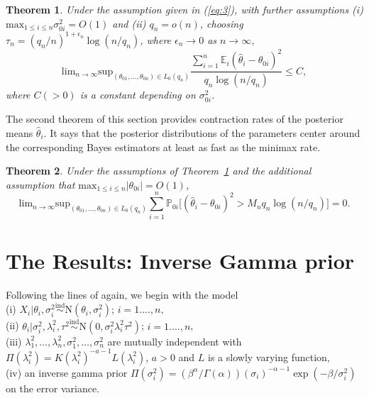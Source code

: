 \documentclass[sn-basic]{sn-jnl}%
\theoremstyle{thmstyleone}%
\newtheorem{theorem}{Theorem}[section]%
\begin{document}
\noindent
\begin{theorem}\label{thm:exp1}
Under the assumption given in (\ref{eq:3}), with further assumptions (i)  
$\mbox{max}_{1\leq i\leq n}\sigma_{0i}^2=O(1)$ and
(ii) $q_n=o(n)$, choosing $\tau_n=(q_n/n)^{1+\epsilon_n}\log(n/q_n)$, where
$\epsilon_n\rightarrow 0$ as $n\rightarrow\infty$,
\begin{equation}
\mbox{lim}_{n\rightarrow\infty}
\mbox{sup}_{(\theta_{01},\ldots,\theta_{0n})\in L_0(q_n)}
\frac{\sum_{i=1}^n \mathbb{E}_{i}(\hat{\theta}_i-\theta_{0i})^2}
{q_n\log(n/q_n)}\leq C,
\label{eq:theorem1}
\end{equation}
where $C(>0)$ is a constant depending on $\sigma_{0i}^2$.
\end{theorem}

\noindent
The second theorem of this section provides contraction rates of the 
posterior means $\hat{\theta}_i$. It says that the posterior distributions
of the parameters center around the corresponding Bayes estimators at least
as fast as the minimax rate.\\

\noindent
\begin{theorem}\label{thm:exp2}
Under the assumptions of Theorem~\ref{thm:exp1} and the additional assumption that
$\mbox{max}_{1\leq i\leq n}|\theta_{0i}|=O(1)$,
\begin{equation}
\mbox{lim}_{n\rightarrow\infty}
\mbox{sup}_{(\theta_{01},\ldots,\theta_{0n})\in L_0(q_n)}
\sum_{i=1}^n \mathbb{P}_{0i}[(\hat{\theta}_i-\theta_{0i})^2>M_n{q_n\log(n/q_n)]}=0.
\label{eq:theorem2}
\end{equation}
\end{theorem}


\section{The Results: Inverse Gamma prior}\label{sec:results-inversegamma}

\noindent
Following the lines of \citet{ghosh2017} again, we begin with the model\\
(i) $X_i|\theta_i,\sigma_i^2\stackrel{\mbox{ind}}
{\sim}\mbox{N}(\theta_i,\sigma_i^2)$;
$i=1.\ldots,n,$\\
(ii) $\theta_i|\sigma_i^2,\lambda_i^2,\tau^2\stackrel{\mbox{ind}}{\sim}
\mbox{N}(0,\sigma_i^2\lambda_i^2\tau^2)$; $i=1.\ldots,n$,\\
(iii) $\lambda_1^2,\ldots,\lambda_n^2,\sigma_1^2,\ldots,\sigma_n^2$ are mutually
independent with $\Pi(\lambda_i^2)=K(\lambda_i^2)^{-a-1}L(\lambda_i^2)$,
$a>0$ and $L$ is a slowly varying function,\\
(iv) an inverse gamma prior $\Pi(\sigma_i^2)=(\beta^\alpha/\Gamma(\alpha)) (\sigma_i)^{-\alpha-1} \exp(-\beta/\sigma_i^2)$ on the error variance.\\ 
\end{document}
